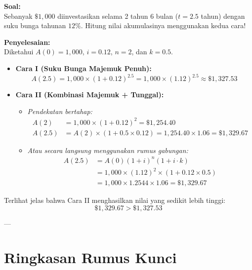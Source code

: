 \documentclass[11pt,a4paper]{article}
\begin{document}
\begin{examplebox}
\textbf{Soal:}\\
Sebanyak $\$1{,}000$ diinvestasikan selama 2 tahun 6 bulan ($t = 2.5$ tahun) dengan suku bunga tahunan $12\%$. Hitung nilai akumulasinya menggunakan kedua cara!

\vspace{0.5em}
\textbf{Penyelesaian:}\\
Diketahui $A(0) = 1{,}000$, $i = 0.12$, $n = 2$, dan $k = 0.5$.
\begin{itemize}
    \item \textbf{Cara I (Suku Bunga Majemuk Penuh):}
    \begin{equation*}
        A(2.5) = 1{,}000 \times (1 + 0.12)^{2.5} = 1{,}000 \times (1.12)^{2.5} \approx \$1{,}327.53
    \end{equation*}
    \item \textbf{Cara II (Kombinasi Majemuk + Tunggal):}
    \begin{itemize}
        \item \emph{Pendekatan bertahap:}
        \begin{align*}
            A(2) &= 1{,}000 \times (1 + 0.12)^2 = \$1{,}254.40 \\
            A(2.5) &= A(2) \times (1 + 0.5 \times 0.12) = 1{,}254.40 \times 1.06 = \$1{,}329.67
        \end{align*}
        \item \emph{Atau secara langsung menggunakan rumus gabungan:}
        \begin{align*}
            A(2.5) &= A(0)(1+i)^n(1 + i \cdot k) \\
                   &= 1{,}000 \times (1.12)^2 \times (1 + 0.12 \times 0.5) \\
                   &= 1{,}000 \times 1.2544 \times 1.06 = \$1{,}329.67
        \end{align*}
    \end{itemize}
\end{itemize}
Terlihat jelas bahwa Cara II menghasilkan nilai yang sedikit lebih tinggi:
\begin{equation*}
    \$1{,}329.67 > \$1{,}327.53
\end{equation*}
\end{examplebox}

---

\section{Ringkasan Rumus Kunci}
\end{document}
